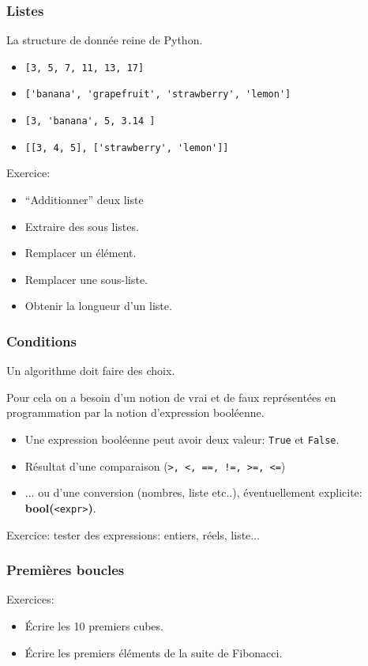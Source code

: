\documentclass{beamer}
\begin{document}
\begin{frame}[fragile]\frametitle{Listes}
  La structure de donnée reine de Python.
  \begin{itemize}
  \item \verb|[3, 5, 7, 11, 13, 17]|
  \item \verb|['banana', 'grapefruit', 'strawberry', 'lemon']|
  \item \verb|[3, 'banana', 5, 3.14 ]|
  \item \verb|[[3, 4, 5], ['strawberry', 'lemon']]|
  \end{itemize}
  Exercice:
  \begin{itemize}
  \item ``Additionner'' deux liste
  \item Extraire des sous listes.
  \item Remplacer un élément.
  \item Remplacer une sous-liste.
  \item Obtenir la longueur d'un liste.
  \end{itemize}
\end{frame}

\begin{frame}[fragile]\frametitle{Conditions}
  Un algorithme doit faire des choix.
  
  

  Pour cela on a besoin d'un notion de vrai et de faux représentées en programmation par la notion d'expression booléenne.
  \begin{itemize}
    \item Une expression booléenne peut avoir deux valeur: \verb|True| et \verb|False|.
    \item Résultat d'une comparaison (\verb|>, <, ==, !=, >=, <=|)
    \item ... ou d'une conversion (nombres, liste etc..), éventuellement explicite: {\bf bool(}\verb|<expr>|{\bf{)}}.
  \end{itemize}
  Exercice: tester des expressions: entiers, réels, liste...
\end{frame}

\begin{frame}[fragile]\frametitle{Premières boucles}
  \center{\fbox{}}
  
  Exercices:
  \begin{itemize}
  \item Écrire les 10 premiers cubes.
  \item Écrire les premiers éléments de la suite de Fibonacci.
  \end{itemize}
\end{frame}
\end{document}
